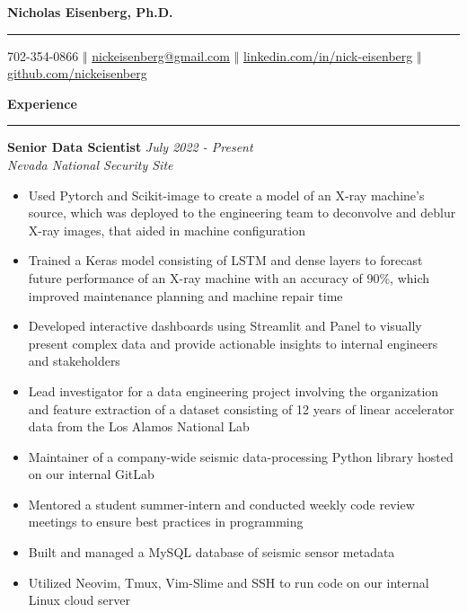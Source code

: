 \documentclass[11pt]{article}
\begin{document}
\thispagestyle{empty}

\begin{center}
  \bf \Huge  Nicholas Eisenberg, Ph.D.
  \vspace{.1em}
  \hrule
\end{center}

\begin{center}
  \vspace{.4em}
  702-354-0866 $\Big \Vert$
  \href{mailto:nickeisenberg@gmail.com}{nickeisenberg@gmail.com} $\Big \Vert$ 
  \href{https://www.linkedin.com/in/nick-eisenberg/}{linkedin.com/in/nick-eisenberg} $\Big \Vert$
  \href{https://github.com/nickeisenberg}{github.com/nickeisenberg}
\end{center}

\textbf{\Large Experience}
\vspace{.3em}
\hrule
\vspace{.3em}

\textbf{\large Senior Data Scientist} \hfill \textit{July 2022 - Present}\\
\textit{Nevada National Security Site} 

\begin{itemize} \setlength\itemsep{-0.5em}
  \item Used Pytorch and Scikit-image to create a model of an X-ray machine's source,
  which was deployed to the engineering team to deconvolve and deblur X-ray images, that aided in machine configuration
  \item Trained a Keras model consisting of LSTM and dense layers to forecast
  future performance of an X-ray machine with an accuracy of 90\%, which improved maintenance
  planning and machine repair time
  \item Developed interactive dashboards using Streamlit and Panel to
  visually present complex data and provide actionable insights to
  internal engineers and stakeholders
  \item Lead investigator for a data engineering project involving
  the organization and feature extraction of a dataset consisting of
  12 years of linear accelerator data from the Los Alamos National Lab
  \item Maintainer of a company-wide seismic data-processing Python library
  hosted on our internal GitLab
  \item Mentored a student summer-intern and conducted weekly code review meetings
  to ensure best practices in programming
  \item Built and managed a MySQL database of seismic sensor metadata
  \item Utilized Neovim, Tmux, Vim-Slime and SSH to
  run code on our internal Linux cloud server
\end{itemize}
\end{document}
